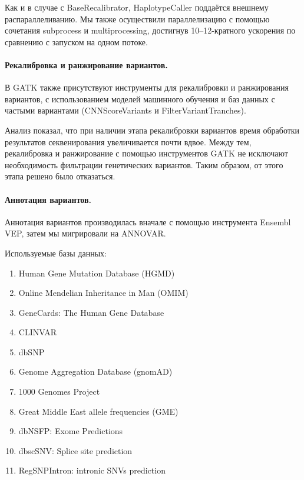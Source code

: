 \documentclass[a4paper,12pt]{article}
\begin{document}
Как и в случае с BaseRecalibrator, HaplotypeCaller поддаётся внешнему распараллеливанию\cite{Heldenbrand_2019}.
Мы также осуществили параллелизацию с помощью сочетания subprocess и multiprocessing, достигнув 10--12-кратного ускорения по сравнению с запуском на одном потоке.

\paragraph{Рекалибровка и ранжирование вариантов.}
В GATK также присутствуют инструменты для рекалибровки и ранжирования вариантов, с использованием моделей машинного обучения и баз данных с частыми вариантами (CNNScoreVariants и FilterVariantTranches).

Анализ показал, что при наличии этапа рекалибровки вариантов время обработки результатов секвенирования увеличивается почти вдвое.
Между тем, рекалибровка и ранжирование с помощью инструментов GATK не исключают необходимость фильтрации генетических вариантов.
Таким образом, от этого этапа решено было отказаться.

\paragraph{Аннотация вариантов.}
Аннотация вариантов производилась вначале с помощью инструмента Ensembl VEP\cite{McLaren_2016}, затем мы мигрировали на ANNOVAR\cite{Wang_2010}.

Используемые базы данных:

\begin{enumerate}
\item Human Gene Mutation Database (HGMD\textregistered)\cite{Stenson_2017}
\item Online Mendelian Inheritance in Man (OMIM\textregistered)\cite{Amberger_2014}
\item GeneCards\textregistered: The Human Gene Database\cite{Stelzer_2016}
\item CLINVAR\cite{Landrum_2017}
\item dbSNP\cite{Sherry_2001}
\item Genome Aggregation Database (gnomAD)\cite{Karczewski_2020}
\item 1000 Genomes Project\cite{Auton_2015}
\item Great Middle East allele frequencies (GME)\cite{Scott_2016}
\item dbNSFP: Exome Predictions\cite{Liu_2016}
\item dbscSNV: Splice site prediction\cite{Jian_2013}
\item RegSNPIntron: intronic SNVs prediction\cite{Lin_2019}
\end{enumerate}
\end{document}

